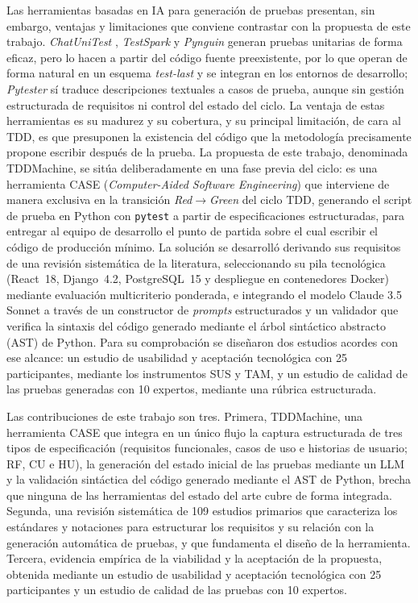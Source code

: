 \documentclass[10pt,journal,twoside,letterpaper]{IEEEtran}
\begin{document}
    Las herramientas basadas en IA para generación de pruebas presentan, sin embargo, ventajas y limitaciones que conviene contrastar con la propuesta de este trabajo. \emph{ChatUniTest} \cite{chen2024chatunitest}, \emph{TestSpark} \cite{sapozhnikov2024testspark} y \emph{Pynguin} \cite{lukasczyk2022pynguin} generan pruebas unitarias de forma eficaz, pero lo hacen a partir del código fuente preexistente, por lo que operan de forma natural en un esquema \emph{test-last} y se integran en los entornos de desarrollo; \emph{Pytester} \cite{takerngsaksiri2025pytester} sí traduce descripciones textuales a casos de prueba, aunque sin gestión estructurada de requisitos ni control del estado del ciclo. La ventaja de estas herramientas es su madurez y su cobertura, y su principal limitación, de cara al TDD, es que presuponen la existencia del código que la metodología precisamente propone escribir después de la prueba. La propuesta de este trabajo, denominada TDDMachine, se sitúa deliberadamente en una fase previa del ciclo: es una herramienta CASE (\emph{Computer-Aided Software Engineering}) que interviene de manera exclusiva en la transición \emph{Red}$\rightarrow$\emph{Green} del ciclo TDD, generando el script de prueba en Python con \texttt{pytest} a partir de especificaciones estructuradas, para entregar al equipo de desarrollo el punto de partida sobre el cual escribir el código de producción mínimo. La solución se desarrolló derivando sus requisitos de una revisión sistemática de la literatura, seleccionando su pila tecnológica (React~18, Django~4.2, PostgreSQL~15 y despliegue en contenedores Docker) mediante evaluación multicriterio ponderada, e integrando el modelo Claude 3.5 Sonnet a través de un constructor de \emph{prompts} estructurados y un validador que verifica la sintaxis del código generado mediante el árbol sintáctico abstracto (AST) de Python. Para su comprobación se diseñaron dos estudios acordes con ese alcance: un estudio de usabilidad y aceptación tecnológica con 25 participantes, mediante los instrumentos SUS y TAM, y un estudio de calidad de las pruebas generadas con 10 expertos, mediante una rúbrica estructurada.
    
    Las contribuciones de este trabajo son tres. Primera, TDDMachine, una herramienta CASE que integra en un único flujo la captura estructurada de tres tipos de especificación (requisitos funcionales, casos de uso e historias de usuario; RF, CU e HU), la generación del estado inicial de las pruebas mediante un LLM y la validación sintáctica del código generado mediante el AST de Python, brecha que ninguna de las herramientas del estado del arte cubre de forma integrada. Segunda, una revisión sistemática de 109 estudios primarios que caracteriza los estándares y notaciones para estructurar los requisitos y su relación con la generación automática de pruebas, y que fundamenta el diseño de la herramienta. Tercera, evidencia empírica de la viabilidad y la aceptación de la propuesta, obtenida mediante un estudio de usabilidad y aceptación tecnológica con 25 participantes y un estudio de calidad de las pruebas con 10 expertos.
    
\end{document}
